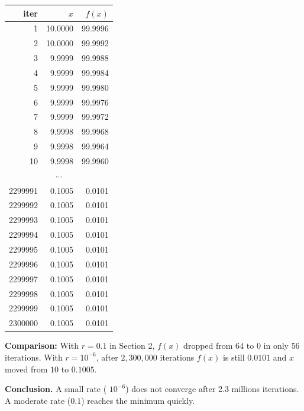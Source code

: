 \documentclass[11pt,a4paper]{article}
\begin{document}
\begin{table}[H]
\centering
\begin{tabular}{rrr}
\toprule
iter & $x$ & $f(x)$ \\
\midrule
1        & 10.0000 & 99.9996 \\
2        & 10.0000 & 99.9992 \\
3        & 9.9999  & 99.9988 \\
4        & 9.9999  & 99.9984 \\
5        & 9.9999  & 99.9980 \\
6        & 9.9999  & 99.9976 \\
7        & 9.9999  & 99.9972 \\
8        & 9.9998  & 99.9968 \\
9        & 9.9998  & 99.9964 \\
10       & 9.9998  & 99.9960 \\
\midrule
\multicolumn{3}{c}{$\cdots$} \\
\midrule
2299991  & 0.1005  & 0.0101 \\
2299992  & 0.1005  & 0.0101 \\
2299993  & 0.1005  & 0.0101 \\
2299994  & 0.1005  & 0.0101 \\
2299995  & 0.1005  & 0.0101 \\
2299996  & 0.1005  & 0.0101 \\
2299997  & 0.1005  & 0.0101 \\
2299998  & 0.1005  & 0.0101 \\
2299999  & 0.1005  & 0.0101 \\
2300000  & 0.1005  & 0.0101 \\
\bottomrule
\end{tabular}
\end{table}

\noindent
\textbf{Comparison: }
With $r=0.1$ in Section 2, $f(x)$ dropped from $64$ to $0$
in only $56$ iterations. With $r=10^{-6}$, after $2{,}300{,}000$
iterations $f(x)$ is still $0.0101$ and $x$ moved from $10$
to $0.1005$. 

\noindent
\textbf{Conclusion.}
A small rate ( $10^{-6}$) does not converge after 2.3 millions iterations. A moderate rate ($0.1$) reaches the
minimum quickly. 
\end{document}
